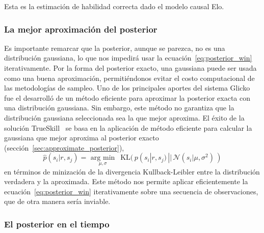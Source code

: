 \documentclass[a4paper,11pt]{book}
\newcommand{\N}{\mathcal{N}}
\theoremstyle{definition}
\begin{document}


Esta es la estimaci\'on de habilidad correcta dado el modelo causal Elo.

\subsubsection{La mejor aproximación del posterior}

Es importante remarcar que la posterior, aunque se parezca, no es una distribuci\'on gaussiana, lo que nos impedir\'a usar la ecuaci\'on~\eqref{eq:posterior_win} iterativamente.
%
Por la forma del posterior exacto, una gaussiana puede ser usada como una buena aproximaci\'on, permiti\'endonos evitar el costo computacional de las metodolog\'ias de sampleo.
%
Uno de los principales aportes del sistema Glicko~\cite{Glikman2013} fue el desarroll\'o de un m\'etodo eficiente para aproximar la posterior exacta con una distribuci\'on gaussiana.
%
Sin embargo, este m\'etodo no garantiza que la distribuci\'on gaussiana seleccionada sea la que mejor aproxima.
%
El \'exito de la soluci\'on TrueSkill~\cite{Herbrich2007} se basa en la aplicaci\'on de m\'etodo eficiente para calcular la gaussiana que mejor aproxima al posterior exacto (secci\'on~\ref{sec:approximate_posterior}),
%
\begin{equation} \label{eq:approx}
 \widehat{p}(s_i| r, s_j) = \underset{\mu, \sigma}{\text{ arg min }} \ \ \text{KL}(\, p(s_i| r, s_j) \, || \,  \N(s_i|\mu, \sigma^2) \, )
\end{equation}
%
en términos de minizaci\'on de la divergencia Kullback-Leibler entre la distribuci\'on verdadera y la aproximada.
%
Este método nos permite aplicar eficientemente la ecuaci\'on~\eqref{eq:posterior_win} iterativamente sobre una secuencia de observaciones, que de otra manera sería inviable.


\subsubsection{El posterior en el tiempo}
\end{document}
